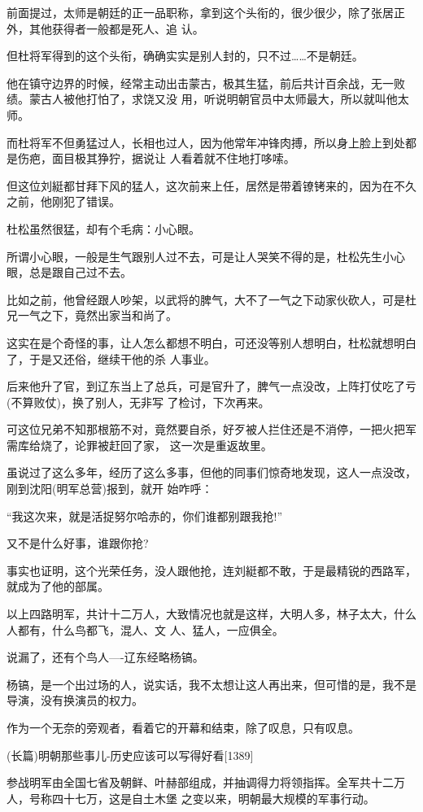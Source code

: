 \documentclass[11pt,a4paper,onecolumn]{article}
\begin{document}
前面提过，太师是朝廷的正一品职称，拿到这个头衔的，很少很少，除了张居正外，其他获得者一般都是死人、追
认。

但杜将军得到的这个头衔，确确实实是别人封的，只不过……不是朝廷。

他在镇守边界的时候，经常主动出击蒙古，极其生猛，前后共计百余战，无一败绩。蒙古人被他打怕了，求饶又没
用，听说明朝官员中太师最大，所以就叫他太师。

而杜将军不但勇猛过人，长相也过人，因为他常年冲锋肉搏，所以身上脸上到处都是伤疤，面目极其狰狞，据说让
人看着就不住地打哆嗦。

但这位刘綎都甘拜下风的猛人，这次前来上任，居然是带着镣铐来的，因为在不久之前，他刚犯了错误。

杜松虽然很猛，却有个毛病：小心眼。

所谓小心眼，一般是生气跟别人过不去，可是让人哭笑不得的是，杜松先生小心眼，总是跟自己过不去。

比如之前，他曾经跟人吵架，以武将的脾气，大不了一气之下动家伙砍人，可是杜兄一气之下，竟然出家当和尚了。

这实在是个奇怪的事，让人怎么都想不明白，可还没等别人想明白，杜松就想明白了，于是又还俗，继续干他的杀
人事业。

后来他升了官，到辽东当上了总兵，可是官升了，脾气一点没改，上阵打仗吃了亏(不算败仗)，换了别人，无非写
了检讨，下次再来。

可这位兄弟不知那根筋不对，竟然要自杀，好歹被人拦住还是不消停，一把火把军需库给烧了，论罪被赶回了家，
这一次是重返故里。

虽说过了这么多年，经历了这么多事，但他的同事们惊奇地发现，这人一点没改，刚到沈阳(明军总营)报到，就开
始咋呼：

``我这次来，就是活捉努尔哈赤的，你们谁都别跟我抢!''

又不是什么好事，谁跟你抢?

事实也证明，这个光荣任务，没人跟他抢，连刘綎都不敢，于是最精锐的西路军，就成为了他的部属。

以上四路明军，共计十二万人，大致情况也就是这样，大明人多，林子太大，什么人都有，什么鸟都飞，混人、文
人、猛人，一应俱全。

说漏了，还有个鸟人----辽东经略杨镐。

杨镐，是一个出过场的人，说实话，我不太想让这人再出来，但可惜的是，我不是导演，没有换演员的权力。

作为一个无奈的旁观者，看着它的开幕和结束，除了叹息，只有叹息。

(长篇)明朝那些事儿-历史应该可以写得好看$[$1389$]$

参战明军由全国七省及朝鲜、叶赫部组成，并抽调得力将领指挥。全军共十二万人，号称四十七万，这是自土木堡
之变以来，明朝最大规模的军事行动。
\end{document}
